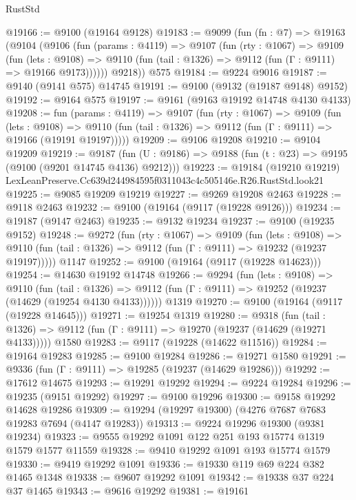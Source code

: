 \begin{lexlean}{RustStd}
\begin{coremodule}
@19166 := @9100 (@19164 @9128)
@19183 := @9099
    (fun (fn : @7) =>
    @19163
      (@9104
        (@9106
          (fun (params : @4119) =>
          @9107
            (fun (rty : @1067) =>
            @9109
              (fun (lets : @9108) =>
              @9110 (fun (tail : @1326) => @9112 (fun (Γ : @9111) => @19166 @9173))))))
        @9218))
    @575
@19184 := @9224 @9016
@19187 := @9140 (@9141 @575) @14745
@19191 := @9100 (@9132 (@19187 @9148) @9152)
@19192 := @9164 @575
@19197 := @9161 (@9163 @19192 @14748 @4130 @4133)
@19208 := fun (params : @4119) =>
  @9107
    (fun (rty : @1067) =>
    @9109
      (fun (lets : @9108) =>
      @9110 (fun (tail : @1326) => @9112 (fun (Γ : @9111) => @19166 (@19191 @19197)))))
@19209 := @9106 @19208
@19210 := @9104 @19209
@19219 := @9187
    (fun (U : @9186) => @9188 (fun (t : @23) => @9195 (@9100 (@9201 @14745 @4136) @9212)))
@19223 := @19184
    (@19210 @19219)
    LexLeanPreserve.Cc639d244984595f0311043c4c505146e.R26.RustStd.look21
@19225 := @9085 @19209 @19219
@19227 := @9269 @19208 @2463
@19228 := @9118 @2463
@19232 := @9100 (@19164 (@9117 (@19228 @9126)))
@19234 := @19187 (@9147 @2463)
@19235 := @9132 @19234
@19237 := @9100 (@19235 @9152)
@19248 := @9272
    (fun (rty : @1067) =>
    @9109
      (fun (lets : @9108) =>
      @9110 (fun (tail : @1326) => @9112 (fun (Γ : @9111) => @19232 (@19237 @19197)))))
    @1147
@19252 := @9100 (@19164 (@9117 (@19228 @14623)))
@19254 := @14630 @19192 @14748
@19266 := @9294
    (fun (lets : @9108) =>
    @9110
      (fun (tail : @1326) =>
      @9112 (fun (Γ : @9111) => @19252 (@19237 (@14629 (@19254 @4130 @4133))))))
    @1319
@19270 := @9100 (@19164 (@9117 (@19228 @14645)))
@19271 := @19254 @1319
@19280 := @9318
    (fun (tail : @1326) => @9112 (fun (Γ : @9111) => @19270 (@19237 (@14629 (@19271 @4133)))))
    @1580
@19283 := @9117 (@19228 (@14622 @11516))
@19284 := @19164 @19283
@19285 := @9100 @19284
@19286 := @19271 @1580
@19291 := @9336 (fun (Γ : @9111) => @19285 (@19237 (@14629 @19286)))
@19292 := @17612 @14675
@19293 := @19291 @19292
@19294 := @9224 @19284
@19296 := @19235 (@9151 @19292)
@19297 := @9100 @19296
@19300 := @9158 @19292 @14628 @19286
@19309 := @19294 (@19297 @19300) (@4276 @7687 @7683 @19283 @7694 (@4147 @19283))
@19313 := @9224 @19296 @19300 (@9381 @19234)
@19323 := @9555 @19292 @1091 @122 @251 @193 @15774 @1319 @1579 @1577 @11559
@19328 := @9410 @19292 @1091 @193 @15774 @1579
@19330 := @9419 @19292 @1091
@19336 := @19330 @119 @69 @224 @382 @1465 @1348
@19338 := @9607 @19292 @1091
@19342 := @19338 @37 @224 @37 @1465
@19343 := @9616 @19292
@19381 := @19161

\end{coremodule}
\end{lexlean}
